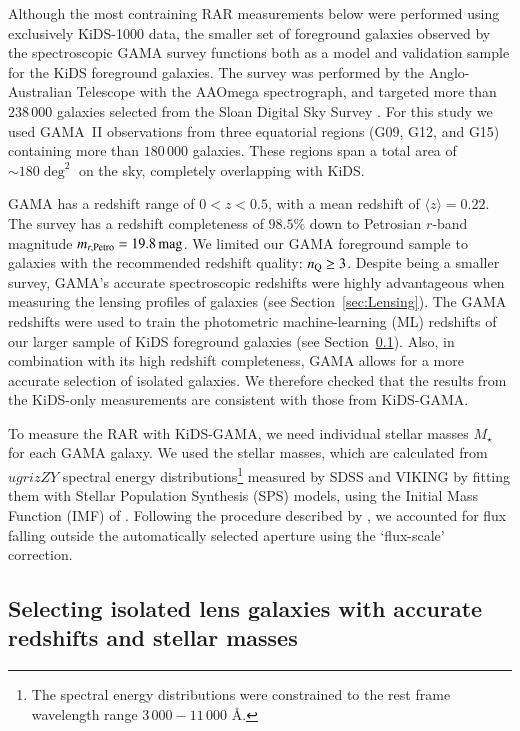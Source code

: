 \documentclass{aa}
\newcommand{\magn}{\,{\rm mag} }
\newcommand*{\meanb}[1]{\langle{#1}\rangle}
\newcommand{\un}[1]{_{\rm #1}}
\begin{document}
Although the most contraining RAR measurements below were performed using exclusively KiDS-1000 data, the smaller set of foreground galaxies observed by the spectroscopic GAMA survey \cite[]{driver2011} functions both as a model and validation sample for the KiDS foreground galaxies. The survey was performed by the Anglo-Australian Telescope with the AAOmega spectrograph, and targeted more than $238\,000$ galaxies selected from the Sloan Digital Sky Survey \cite[SDSS;]{abazajian2009}. For this study we used GAMA~II observations \cite[]{liske2015} from three equatorial regions (G09, G12, and G15) containing more than $180\,000$ galaxies. These regions span a total area of $\sim180 \deg^2$ on the sky, completely overlapping with KiDS.

GAMA has a redshift range of $0<z<0.5$, with a mean redshift of $\meanb{z}=0.22$. The survey has a redshift completeness of $98.5\%$ down to Petrosian $r$-band magnitude $m_{r, {\rm Petro}} = 19.8 \magn$. We limited our GAMA foreground sample to galaxies with the recommended redshift quality: $n\un{Q}\geq3$. Despite being a smaller survey, GAMA's accurate spectroscopic redshifts were highly advantageous when measuring the lensing profiles of galaxies (see Section~\ref{sec:Lensing}). The GAMA redshifts were used to train the photometric machine-learning (ML) redshifts of our larger sample of KiDS foreground galaxies (see Section~\ref{sec:KiDS-bright}). Also, in combination with its high redshift completeness, GAMA allows for a more accurate selection of isolated galaxies. We therefore checked that the results from the KiDS-only measurements are consistent with those from KiDS-GAMA.

To measure the RAR with KiDS-GAMA, we need individual stellar masses $M_\star$ for each GAMA galaxy. We used the \cite{taylor2011} stellar masses, which are calculated from $ugrizZY$ spectral energy distributions\footnote{The spectral energy distributions were constrained to the rest frame wavelength range $3\,000-11\,000$ \AA.} measured by SDSS and VIKING by fitting them with \cite{bruzual2003} Stellar Population Synthesis (SPS) models, using the Initial Mass Function (IMF) of \cite{chabrier2003}. Following the procedure described by \cite{taylor2011}, we accounted for flux falling outside the automatically selected aperture using the `flux-scale' correction.

\subsection{Selecting isolated lens galaxies with accurate redshifts and stellar masses}
\label{sec:KiDS-bright}
\end{document}
